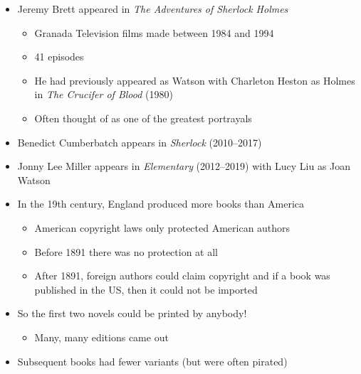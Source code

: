 \documentclass[a4paper,landscape,headrule,footrule,xetex]{foils}
\begin{document}
\begin{itemize}
\item Jeremy Brett appeared in \textit{The Adventures of Sherlock Holmes}
  \begin{itemize}
  \item Granada Television films made between 1984 and 1994
  \item 41 episodes
  \item He had previously appeared as Watson with Charleton Heston as Holmes in \textit{The Crucifer of Blood} (1980)
  \item Often thought of as one of the greatest portrayals
  \end{itemize}
\item Benedict Cumberbatch appears in \textit{Sherlock} (2010–2017) 
\item Jonny Lee Miller 	appears in \textit{Elementary} 	(2012–2019) with Lucy Liu as Joan Watson
\end{itemize}





\begin{itemize}
\item In the 19th century, England produced more books than America
  \begin{itemize}
  \item American copyright laws only protected American authors
  \item Before 1891 there was no protection at all
  \item After 1891, foreign authors could claim copyright and if a
    book was published in the US, then it could not be imported
  \end{itemize}
\item So the first two novels could be printed by anybody!
  \begin{itemize}
  \item Many, many editions came out
  \end{itemize}
\item Subsequent books had fewer variants (but were often pirated)
\end{itemize}

\end{document}
